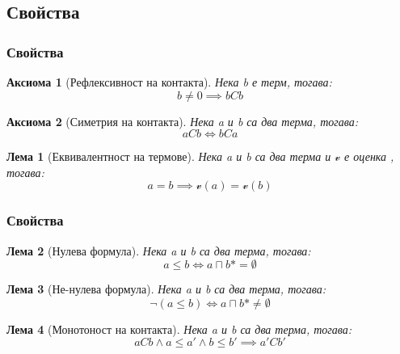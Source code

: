 \documentclass{beamer}
\newtheorem{axiom}{Аксиома}[section]
\newtheorem{lema}{Лема}[section]
\begin{document}
\subsection{Свойства}
\begin{frame}\frametitle{Свойства}

\begin{axiom}[Рефлексивност на контакта]
Нека b е терм, тогава:
	\begin{equation*}
		b \neq 0 \implies bCb
	\end{equation*}
\end{axiom}

\begin{axiom}[Симетрия на контакта]
Нека a и b са два терма, тогава:
	\begin{equation*}
		aCb \iff bCa
	\end{equation*}
\end{axiom}

\begin{lema}[Еквивалентност на термове]
Нека a и b са два терма и $\mathscr{v}$ е оценка , тогава:
	\begin{equation*}
		a = b \implies \mathscr{v}(a) = \mathscr{v}(b)
	\end{equation*}
\end{lema}

\end{frame}
\begin{frame}\frametitle{Свойства}
\begin{lema}[Нулева формула]
Нека a и b са два терма, тогава:
	\begin{equation*}
		a \le b \iff a \sqcap b* = \emptyset
	\end{equation*}
\end{lema}

\begin{lema}[Не-нулева формула]
Нека a и b са два терма, тогава:
	\begin{equation*}
		\neg(a \le b) \iff a \sqcap b* \neq \emptyset
	\end{equation*}
\end{lema}

\begin{lema}[Монотоност на контакта]
Нека a и b са два терма, тогава:
	\begin{equation*}
		aCb \land a \leq a' \land b \le b' \implies a'Cb'
	\end{equation*}
\end{lema}

\end{frame}
\end{document}
